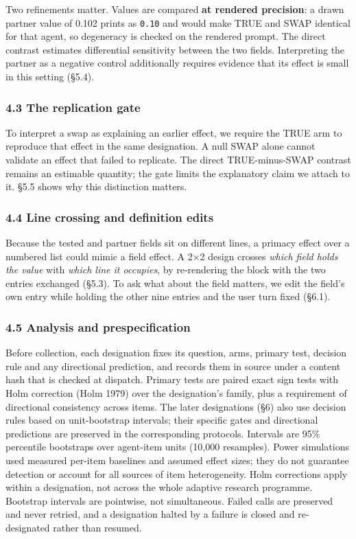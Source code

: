 \documentclass[
  11pt]{article}
\begin{document}
Two refinements matter. Values are compared \textbf{at rendered
precision}: a drawn partner value of 0.102 prints as \texttt{0.10} and
would make TRUE and SWAP identical for that agent, so degeneracy is
checked on the rendered prompt. The direct contrast estimates
differential sensitivity between the two fields. Interpreting the
partner as a negative control additionally requires evidence that its
effect is small in this setting (§5.4).

\subsubsection{4.3 The replication gate}\label{the-replication-gate}

To interpret a swap as explaining an earlier effect, we require the TRUE
arm to reproduce that effect in the same designation. A null SWAP alone
cannot validate an effect that failed to replicate. The direct
TRUE-minus-SWAP contrast remains an estimable quantity; the gate limits
the explanatory claim we attach to it. §5.5 shows why this distinction
matters.

\subsubsection{4.4 Line crossing and definition
edits}\label{line-crossing-and-definition-edits}

Because the tested and partner fields sit on different lines, a primacy
effect over a numbered list could mimic a field effect. A 2×2 design
crosses \emph{which field holds the value} with \emph{which line it
occupies}, by re-rendering the block with the two entries exchanged
(§5.3). To ask what about the field matters, we edit the field's own
entry while holding the other nine entries and the user turn fixed
(§6.1).

\subsubsection{4.5 Analysis and
prespecification}\label{analysis-and-prespecification}

Before collection, each designation fixes its question, arms, primary
test, decision rule and any directional prediction, and records them in
source under a content hash that is checked at dispatch. Primary tests
are paired exact sign tests with Holm correction (Holm 1979) over the
designation's family, plus a requirement of directional consistency
across items. The later designations (§6) also use decision rules based
on unit-bootstrap intervals; their specific gates and directional
predictions are preserved in the corresponding protocols. Intervals are
95\% percentile bootstraps over agent-item units (10,000 resamples).
Power simulations used measured per-item baselines and assumed effect
sizes; they do not guarantee detection or account for all sources of
item heterogeneity. Holm corrections apply within a designation, not
across the whole adaptive research programme. Bootstrap intervals are
pointwise, not simultaneous. Failed calls are preserved and never
retried, and a designation halted by a failure is closed and
re-designated rather than resumed.
\end{document}
